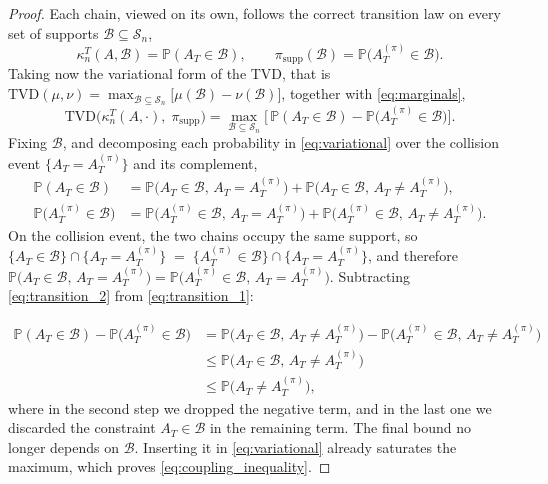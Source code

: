 \documentclass[
    aps,
    superscriptaddress,
    onecolumn,
    10pt,
    prx,
    nofootinbib
]{revtex4-2}
\theoremstyle{namedstatement}
\theoremstyle{plain}
\begin{document}
\begin{proof}
Each chain, viewed on its own, follows the correct transition law on every set of supports $\mathcal{B} \subseteq \mathcal{S}_n$,
\begin{equation}\label{eq:marginals}
    \kappa_n^{T}(A,\mathcal{B}) = \mathbb{P}(A_T \in \mathcal{B}),
    \qquad
    \pi_{\mathrm{supp}}(\mathcal{B}) = \mathbb{P}\big(A^{(\pi)}_T \in \mathcal{B}\big).
\end{equation}
Taking now the variational form of the TVD, that is $\mathrm{TVD}(\mu,\nu) = \max_{\mathcal{B} \subseteq \mathcal{S}_n}
\big[\mu(\mathcal{B}) - \nu(\mathcal{B})\big]$, together with
\cref{eq:marginals},
\begin{equation}\label{eq:variational}
    \mathrm{TVD}\big( \kappa_n^{T}(A,\cdot),\; \pi_{\mathrm{supp}} \big)
    = \max_{\mathcal{B} \subseteq \mathcal{S}_n}
      \Big[\, \mathbb{P}(A_T \in \mathcal{B})
            - \mathbb{P}\big(A^{(\pi)}_T \in \mathcal{B}\big) \Big].
\end{equation}
Fixing $\mathcal{B}$, and decomposing each probability in \cref{eq:variational}
over the collision event $\{A_T = A^{(\pi)}_T\}$ and its complement,
\begin{align}
\label{eq:transition_1}
    \mathbb{P}(A_T \in \mathcal{B})
    &= \mathbb{P}\big(A_T \in \mathcal{B},\, A_T = A^{(\pi)}_T\big)
     + \mathbb{P}\big(A_T \in \mathcal{B},\, A_T \neq A^{(\pi)}_T\big), \\
    \label{eq:transition_2}
    \mathbb{P}\big(A^{(\pi)}_T \in \mathcal{B}\big)
    &= \mathbb{P}\big(A^{(\pi)}_T \in \mathcal{B},\, A_T = A^{(\pi)}_T\big)
     + \mathbb{P}\big(A^{(\pi)}_T \in \mathcal{B},\, A_T \neq A^{(\pi)}_T\big). 
\end{align}
On the collision event, the two chains occupy the same support, so $\{A_T \in \mathcal{B}\} \cap \{A_T = A^{(\pi)}_T\}
    \;=\;
    \{A^{(\pi)}_T \in \mathcal{B}\} \cap \{A_T = A^{(\pi)}_T\}$, and therefore $ \mathbb{P}\big(A_T \in \mathcal{B},\, A_T = A^{(\pi)}_T\big) = \mathbb{P}\big(A^{(\pi)}_T \in \mathcal{B},\, A_T = A^{(\pi)}_T\big)$. Subtracting \cref{eq:transition_2} from \cref{eq:transition_1}:
    
\begin{align}\label{eq:after_cancel}
    \mathbb{P}(A_T \in \mathcal{B})
    - \mathbb{P}\big(A^{(\pi)}_T \in \mathcal{B}\big)
    &=
    \mathbb{P}\big(A_T \in \mathcal{B},\, A_T \neq A^{(\pi)}_T\big)
    - \mathbb{P}\big(A^{(\pi)}_T \in \mathcal{B},\, A_T \neq A^{(\pi)}_T\big) \nonumber\\
    &\leq \mathbb{P}\big(A_T \in \mathcal{B},\, A_T \neq A^{(\pi)}_T\big) \nonumber\\ 
    &\leq
    \mathbb{P}\big(A_T \neq A^{(\pi)}_T\big),
\end{align}
where in the second step we dropped the negative term, and in the last one we discarded the constraint $A_T\in\mathcal{B}$ in the remaining term. The final bound no longer depends on $\mathcal{B}$. Inserting it in \cref{eq:variational} already saturates the maximum, which proves
\cref{eq:coupling_inequality}.
\end{proof}
\end{document}
